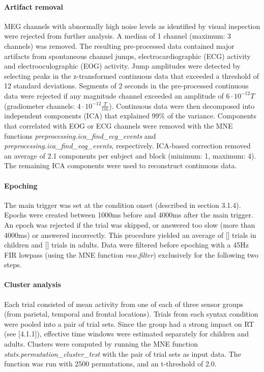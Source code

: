 \paragraph{Artifact removal}
MEG channels with abnormally high noise levels as identified by visual inspection were rejected from further analysis. A median of 1 channel (maximum: 3 channels) was removed.
The resulting pre-processed data contained major artifacts from spontaneous channel jumps, electrocardiographic (ECG) activity and electrooculographic (EOG) activity.
Jump amplitudes were detected by selecting peaks in the z-transformed continuous data that exceeded a threshold of 12 standard deviations.
Segments of 2 seconds in the pre-processed continuous data were rejected if any magnitude channel exceeded an amplitude of $6\cdot10^{-12}T$ (gradiometer channels: $4\cdot10^{-12}\frac{T}{cm}$).
Continuous data were then decomposed into independent components (ICA) that explained 99\% of the variance.
Components that correlated with EOG or ECG channels were removed with the MNE functions \emph{preprocessing.ica\_find\_ecg\_events} and \emph{preprocessing.ica\_find\_eog\_events}, respectively.
ICA-based correction removed an average of 2.1 components per subject and block (minimum: 1, maximum: 4).
The remaining ICA components were used to reconstruct continuous data.

\paragraph{Epoching}
The main trigger was set at the condition onset (described in section 3.1.4).
Epochs were created between 1000ms before and 4000ms after the main trigger.
An epoch was rejected if the trial was skipped, or answered too slow (more than 4000ms) or answered incorrectly.
This procedure yielded an average of [] trials in children and [] trials in adults.
Data were filtered before epoching with a 45Hz FIR lowpass (using the MNE function \emph{raw.filter}) exclusively for the following two steps.

\paragraph{Cluster analysis}
Each trial consisted of mean activity from one of each of three sensor groups (from parietal, temporal and frontal locations).
Trials from each syntax condition were pooled into a pair of trial sets.
Since the group had a strong impact on RT (see [4.1.1]), effective time windows were estimated separately for children and adults.
Clusters were computed by running the MNE function \emph{stats.permutation\_cluster\_test} \cite{3.3.clustertest} with the pair of trial sets as input data.
The function was run with 2500 permutations, and an t-threshold of 2.0.

